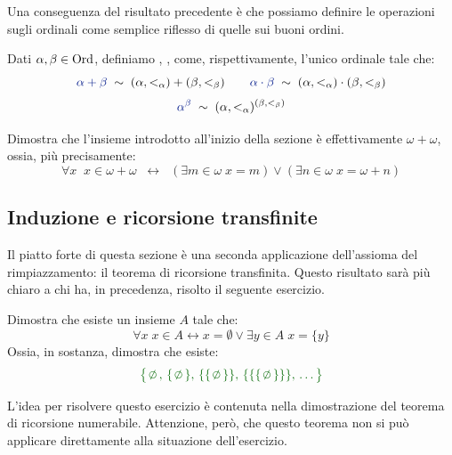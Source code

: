 Una conseguenza del risultato precedente \`e che possiamo definire le
operazioni sugli ordinali come semplice riflesso di quelle sui buoni
ordini.

\begin{definition}
	Dati $\alpha,\beta \in\operatorname{Ord}$, definiamo \vocab{$\alpha + \beta$}, \vocab{$\alpha\cdot\beta$}, \vocab{$\alpha^\beta$} come, rispettivamente, l'unico ordinale tale che:
	\[ {\drkblu\alpha + \beta} \;\sim\;
(\alpha,<_\alpha)+(\beta,<_\beta) \qquad {\drkblu\alpha \cdot \beta}
\;\sim\; (\alpha,<_\alpha) \cdot (\beta,<_\beta)
		\]\[ {\drkblu\alpha^\beta} \;\sim\; (\alpha,<_\alpha)^{(\beta,<_\beta)}
			\]
\end{definition}

\begin{exercise}
	Dimostra che l'insieme introdotto all'inizio della sezione \`e effettivamente $\omega + \omega$, ossia, pi\`u precisamente:
	\[ \forall x \;\; x \in \omega + \omega \;\; \leftrightarrow
\;\;(\exists {m \in \omega} \; x = m) \lor (\exists {n \in \omega} \; x = \omega +n)
		\]
\end{exercise}

\subsection{Induzione e ricorsione transfinite}

Il piatto forte di questa sezione \`e una seconda applicazione dell'assioma del rimpiazzamento: il teorema di ricorsione transfinita. Questo risultato sar\`a pi\`u chiaro a chi ha, in precedenza, risolto il seguente esercizio.

\begin{exercise}
	Dimostra che esiste un insieme $A$ tale che:
	\[ \forall x \; x \in A \leftrightarrow x = \emptyset \lor \exists y \in A \; x = \{y\}
		\]
	{\drkgrn Ossia, in sostanza, dimostra che esiste:}
	\[
{\drkgrn\big\oldparen\emptyset,\,\{\emptyset\},\,\{\{\emptyset\}\},\,\{\{\{\emptyset\}\}\},\,\ldots\big\}}
		\]
\end{exercise}

L'idea per risolvere questo esercizio \`e contenuta nella dimostrazione del teorema di ricorsione numerabile. Attenzione, per\`o,
che questo teorema non si pu\`o applicare direttamente alla situazione dell'esercizio.

